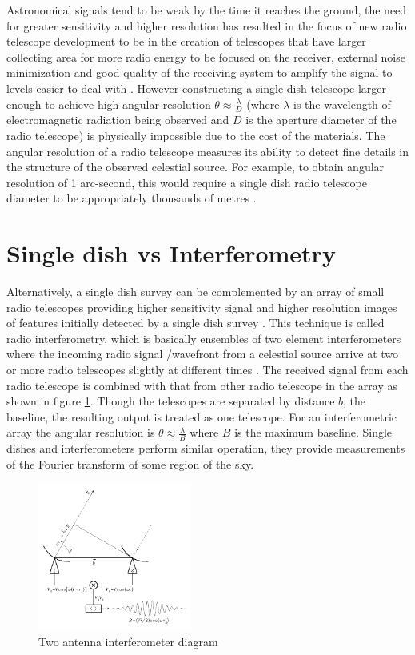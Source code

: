 Astronomical signals tend to be weak by the time it reaches the ground, the need for greater sensitivity and higher resolution has resulted in the focus of new radio telescope development to be in the creation of telescopes that have larger collecting area for more radio energy to be focused on the receiver, external noise minimization and good quality of the receiving system to amplify the signal to levels easier to deal with \citep{verschuur2015invisible}. However constructing a single dish telescope larger enough to achieve high angular resolution $\theta \approx\frac{\lambda}{D}$ (where $\lambda$ is the wavelength of electromagnetic radiation  being observed and $D$ is the aperture diameter of the radio telescope) is physically impossible due to the cost of the materials. The angular resolution of a radio telescope measures its ability to detect fine details in the structure of the observed celestial source. For example, to obtain angular resolution of 1 arc-second, this would require a single dish radio telescope diameter to be appropriately thousands of metres \citep{verschuur2015invisible}. 

\section{Single dish vs Interferometry}
\label{RvI}
Alternatively, a single dish survey can be complemented by an array of small radio telescopes providing higher sensitivity signal and higher resolution images of features initially detected by a single dish survey \citep{wright2004single}. This technique is called radio interferometry, which is basically ensembles of two element interferometers where the incoming radio signal /wavefront from a celestial source arrive at two or more radio telescopes slightly at different times \citep{verschuur2015invisible}. The received signal from each radio telescope is combined with that from other radio telescope in the array as shown in figure \ref{images/Rint.png}. Though the telescopes are separated by distance $b$, the baseline, the resulting output is treated as one telescope. For an interferometric array the angular resolution is $\theta \approx\frac{\lambda}{B}$ where $B$ is the maximum baseline. Single dishes and interferometers  perform similar operation, they provide measurements of the Fourier transform of some region of the sky.

\begin{figure}[h!]
  \centering
    \includegraphics[width=0.45\textwidth]{images/Rint.png}
    \caption{Two antenna interferometer diagram}
  \label{images/Rint.png}
\end{figure}

